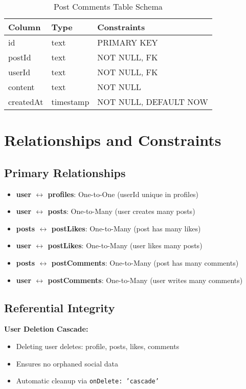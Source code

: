 \documentclass[12pt,a4paper]{report}
\begin{document}
\begin{table}[H]
\centering
\caption{Post Comments Table Schema}
\begin{tabular}{@{}lll@{}}
\toprule
\textbf{Column} & \textbf{Type} & \textbf{Constraints} \\ \midrule
id & text & PRIMARY KEY \\
postId & text & NOT NULL, FK \\
userId & text & NOT NULL, FK \\
content & text & NOT NULL \\
createdAt & timestamp & NOT NULL, DEFAULT NOW \\ \bottomrule
\end{tabular}
\end{table}

\section{Relationships and Constraints}

\subsection{Primary Relationships}

\begin{itemize}
    \item \textbf{user $\leftrightarrow$ profiles}: One-to-One (userId unique in profiles)
    \item \textbf{user $\leftrightarrow$ posts}: One-to-Many (user creates many posts)
    \item \textbf{posts $\leftrightarrow$ postLikes}: One-to-Many (post has many likes)
    \item \textbf{user $\leftrightarrow$ postLikes}: One-to-Many (user likes many posts)
    \item \textbf{posts $\leftrightarrow$ postComments}: One-to-Many (post has many comments)
    \item \textbf{user $\leftrightarrow$ postComments}: One-to-Many (user writes many comments)
\end{itemize}

\subsection{Referential Integrity}

\textbf{User Deletion Cascade:}
\begin{itemize}
    \item Deleting user deletes: profile, posts, likes, comments
    \item Ensures no orphaned social data
    \item Automatic cleanup via \texttt{onDelete: 'cascade'}
\end{itemize}
\end{document}
